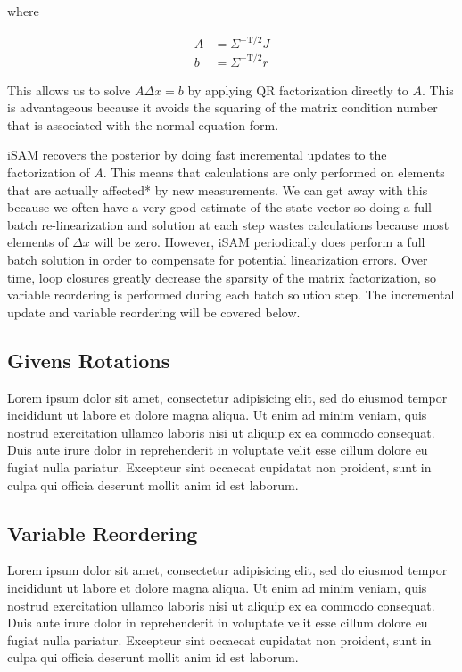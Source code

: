 \documentclass[conference]{IEEEtran}
\begin{document}
where

\begin{align*}
  A &= \Sigma^{-\text{T}/2}J \\
  b &= \Sigma^{-\text{T}/2}r
\end{align*}

This allows us to solve $A\Delta x = b$ by applying QR factorization directly to $A$. This
is advantageous because it avoids the squaring of the matrix condition number that is
associated with the normal equation form. \cite{Kaess08tro}

iSAM recovers the posterior by doing fast incremental updates to the factorization of $A$.
This means that calculations are only performed on elements that are actually affected* by
 new measurements. We can get away with this because we often have a very good estimate of
 the state vector so doing a full batch re-linearization and solution at each step wastes
 calculations because most elements of $\Delta x$ will be zero. However, iSAM periodically
 does perform a full batch solution in order to compensate for potential linearization
 errors. Over time, loop closures greatly decrease the sparsity of the matrix
 factorization, so variable reordering is performed during each batch solution step. The
 incremental update and variable reordering will be covered below.


\subsection*{Givens Rotations}
\label{sub:givensrotations}

Lorem ipsum dolor sit amet, consectetur adipisicing elit, sed do eiusmod tempor incididunt
ut labore et dolore magna aliqua. Ut enim ad minim veniam, quis nostrud exercitation
ullamco laboris nisi ut aliquip ex ea commodo consequat. Duis aute irure dolor in
reprehenderit in voluptate velit esse cillum dolore eu fugiat nulla pariatur. Excepteur
sint occaecat cupidatat non proident, sunt in culpa qui officia deserunt mollit anim id
est laborum.


\subsection*{Variable Reordering}
\label{sub:variablereordering}

Lorem ipsum dolor sit amet, consectetur adipisicing elit, sed do eiusmod tempor incididunt
ut labore et dolore magna aliqua. Ut enim ad minim veniam, quis nostrud exercitation
ullamco laboris nisi ut aliquip ex ea commodo consequat. Duis aute irure dolor in
reprehenderit in voluptate velit esse cillum dolore eu fugiat nulla pariatur. Excepteur
sint occaecat cupidatat non proident, sunt in culpa qui officia deserunt mollit anim id
est laborum.
\end{document}
